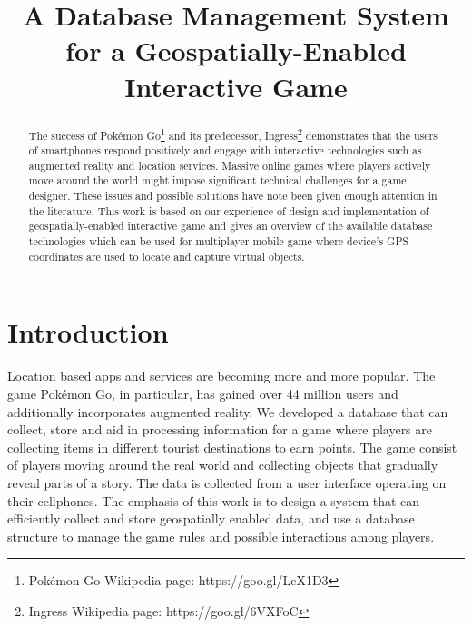 \documentclass[conference]{IEEEtran}
\begin{document}
\title{A Database Management System for a Geospatially-Enabled Interactive Game}
\author{
\and
{}
\and
{}
\and
{}
}

\maketitle

\begin{abstract}
The success of Pokémon Go\footnote[1]{Pokémon Go Wikipedia page: https://goo.gl/LeX1D3} and its predecessor, Ingress\footnote[2]{Ingress Wikipedia page: https://goo.gl/6VXFoC} demonstrates that the users of smartphones respond positively and engage with interactive technologies such as augmented reality and location services. Massive online games where players actively move around the world might impose significant technical challenges for a game designer. These issues and possible solutions have note been given enough attention in the literature. This work is based on our experience of design and implementation of geospatially-enabled interactive game and gives an overview of the available database technologies which can be used for multiplayer mobile game where device's GPS coordinates are used to locate and capture virtual objects. 
\end{abstract}

\IEEEpeerreviewmaketitle

\section{Introduction}
Location based apps and services are becoming more and more popular. The game Pokémon Go, in particular, has gained over 44 million users and additionally incorporates augmented reality. We developed a database that can collect, store and aid in processing information for a game where players are collecting items in different tourist destinations to earn points. The game consist of players moving around the real world and collecting objects that gradually reveal parts of a story. The data is collected from a user interface operating on their cellphones. The emphasis of this work is to design a system that can efficiently collect and store geospatially enabled data, and use a database structure to manage the game rules and possible interactions among players. 
\end{document}
